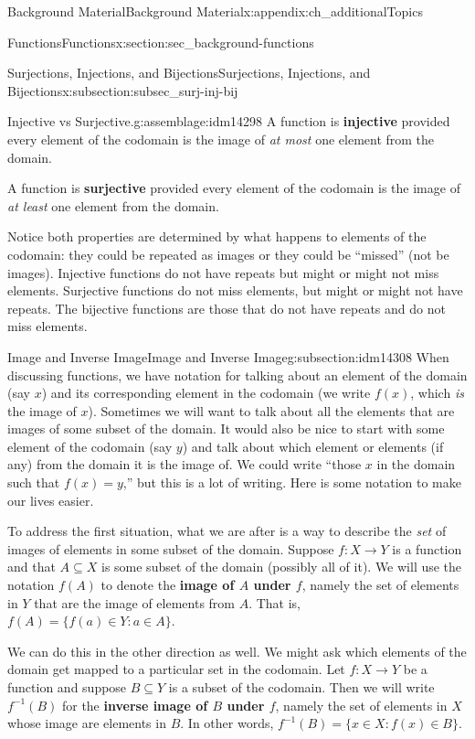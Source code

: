 \documentclass[oneside,10pt,]{book}
\newcommand{\terminology}[1]{\textbf{#1}}
\numberwithin{equation}{chapter}
\def\inv{^{-1}}
\def\st{:}
\begin{document}
\begin{appendixptx}{Background Material}{}{Background Material}{}{}{x:appendix:ch_additionalTopics}
\begin{sectionptx}{Functions}{}{Functions}{}{}{x:section:sec_background-functions}
\begin{subsectionptx}{Surjections, Injections, and Bijections}{}{Surjections, Injections, and Bijections}{}{}{x:subsection:subsec_surj-inj-bij}
\begin{assemblage}{Injective vs Surjective.}{g:assemblage:idm14298}
A function is \terminology{injective} provided every element of the codomain is the image of \emph{at most} one element from the domain.%
\par
A function is \terminology{surjective} provided every element of the codomain is the image of \emph{at least} one element from the domain.%
\end{assemblage}
Notice both properties are determined by what happens to elements of the codomain: they could be repeated as images or they could be ``missed'' (not be images).  Injective functions do not have repeats but might or might not miss elements.  Surjective functions do not miss elements, but might or might not have repeats.  The bijective functions are those that do not have repeats and do not miss elements.%
\end{subsectionptx}
%
%
\typeout{************************************************}
\typeout{************************************************}
%
\begin{subsectionptx}{Image and Inverse Image}{}{Image and Inverse Image}{}{}{g:subsection:idm14308}
When discussing functions, we have notation for talking about an element of the domain (say \(x\)) and its corresponding element in the codomain (we write \(f(x)\), which \emph{is} the image of \(x\)). Sometimes we will want to talk about all the elements that are images of some subset of the domain.  It would also be nice to start with some element of the codomain (say \(y\)) and talk about which element or elements (if any) from the domain it is the image of. We could write ``those \(x\) in the domain such that \(f(x) = y\),'' but this is a lot of writing. Here is some notation to make our lives easier.%
\par
To address the first situation, what we are after is a way to describe the \emph{set} of images of elements in some subset of the domain.  Suppose \(f:X \to Y\) is a function and that \(A \subseteq X\) is some subset of the domain (possibly all of it).  We will use the notation \(f(A)\) to denote the \terminology{image of \(A\) under \(f\)}, namely the set of elements in \(Y\) that are the image of elements from \(A\).  That is, \(f(A) = \{f(a) \in Y \st a \in A\}\). \label{g:notation:idm14330}%
\par
We can do this in the other direction as well.  We might ask which elements of the domain get mapped to a particular set in the codomain.  Let \(f:X \to Y\) be a function and suppose \(B \subseteq Y\) is a subset of the codomain.  Then we will write \(f\inv(B)\) for the \terminology{inverse image of \(B\) under \(f\)}, namely the set of elements in \(X\) whose image are elements in \(B\).  In other words, \(f\inv(B) = \{x \in X \st f(x) \in B\}\). \label{g:notation:idm14345}%

\end{subsectionptx}
\end{sectionptx}
\end{appendixptx}
\end{document}
